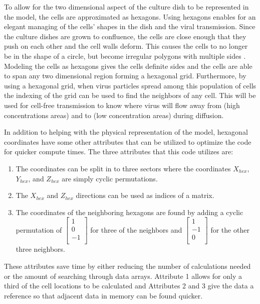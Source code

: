 To allow for the two dimensional aspect of the culture dish to be represented in the model, the cells are approximated as hexagons. Using hexagons enables for an elegant managing of the cells' shapes in the dish and the viral transmission. Since the culture dishes are grown to confluence, the cells are close enough that they push on each other and the cell walls deform. This causes the cells to no longer be in the shape of a circle, but become irregular polygons with multiple sides \citep{bruckner_importance_2018}. Modeling the cells as hexagons gives the cells definite sides and the cells are able to span any two dimensional region forming a hexagonal grid. Furthermore, by using a hexagonal grid, when virus particles spread among this population of cells the indexing of the grid can be used to find the neighbors of any cell. This will be used for cell-free transmission to know where virus will flow away from (high concentrations areas) and to (low concentration areas) during diffusion. 

In addition to helping with the physical representation of the model, hexagonal coordinates have some other attributes that can be utilized to optimize the code for quicker compute times. The three attributes that this code utilizes are:
\begin{enumerate} 
    \item The coordinates can be split in to three sectors where the coordinates $X_{hex}$, $Y_{hex}$, and $Z_{hex}$ are simply cyclic permutations.
    \item The $X_{hex}$ and $Z_{hex}$ directions can be used as indices of a matrix.
    \item The coordinates of the neighboring hexagons are found by adding a cyclic permutation of 
        $\left [
            \begin{array}{c}
                1 \\
                0 \\
                -1\\
            \end{array}
        \right ]$
        for three of the neighbors and
        $\left [ 
            \begin{array}{c}
                1 \\
                -1 \\
                0\\
            \end{array}
        \right ]$
        for the other three neighbors.
\end{enumerate}
These attributes save time by either reducing the number of calculations needed or the amount of searching through data arrays. Attribute 1 allows for only a third of the cell locations to be calculated and Attributes 2 and 3 give the data a reference so that adjacent data in memory can be found quicker.

